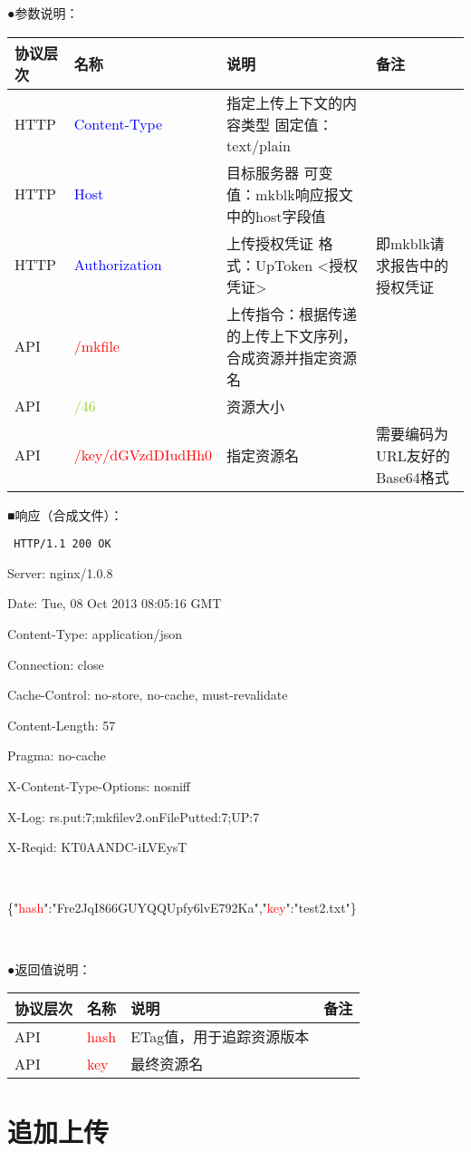 \documentclass[11pt, oneside]{book}
\newcommand{\qblock}[1]{
\vspace{0.1em}
\noindent
#1\par
\vspace{0.1em}
}
\newcommand{\qtable}[1]{\footnotesize\vspace{0.5em}#1\vspace{0.5em}\normalsize}
\newcommand{\qhttp}[1]{\noindent #1\par}
\begin{document}
\qblock{●\thinspace 参数说明：}
\qtable{
\def\arraystretch{2}
\begin{tabular}{|l|p{7em}|p{19em}|p{7em}|}
\hline
协议层次 & 名称 & 说明 & 备注 \\
\hline
HTTP & \textcolor{blue}{Content-Type} & 指定上传上下文的内容类型 \newline 固定值：text/plain & \\
\hline
HTTP & \textcolor{blue}{Host} & 目标服务器 \newline 可变值：mkblk响应报文中的host字段值 & \\
\hline
HTTP & \textcolor{blue}{Authorization} & 上传授权凭证 \newline 格式：UpToken <授权凭证> & 即mkblk请求报告中的授权凭证 \\
\hline
API & \textcolor{red}{/mkfile} & 上传指令：根据传递的上传上下文序列，合成资源并指定资源名 & \\
\hline
API & \textcolor{YellowGreen}{/46} & 资源大小 & \\
\hline
API & \textcolor{red}{/key/dGVzdDIudHh0} & 指定资源名 & 需要编码为URL友好的Base64格式 \\
\hline
\end{tabular}
}

\clearpage 

\qblock{■\thinspace 响应（合成文件）：}
{
\tt \footnotesize
\qhttp{HTTP/1.1 200 OK}
\qhttp{Server: nginx/1.0.8}
\qhttp{Date: Tue, 08 Oct 2013 08:05:16 GMT}
\qhttp{Content-Type: application/json}
\qhttp{Connection: close}
\qhttp{Cache-Control: no-store, no-cache, must-revalidate}
\qhttp{Content-Length: 57}
\qhttp{Pragma: no-cache}
\qhttp{X-Content-Type-Options: nosniff}
\qhttp{X-Log: rs.put:7;mkfilev2.onFilePutted:7;UP:7}
\qhttp{X-Reqid: KT0AANDC-iLVEysT}
\qhttp{\ }
\qhttp{\{"\textcolor{red}{hash}":"Fre2JqI866GUYQQUpfy6lvE792Ka","\textcolor{red}{key}":"test2.txt"\}}
\qhttp{\ }
}

\qblock{●\thinspace 返回值说明：}
\qtable{
\def\arraystretch{2}
\begin{tabular}{|l|p{7em}|p{19em}|p{7em}|}
\hline
协议层次 & 名称 & 说明 & 备注 \\
\hline
API & \textcolor{red}{hash} & ETag值，用于追踪资源版本 & \\
\hline
API & \textcolor{red}{key} & 最终资源名 & \\
\hline
\end{tabular}
}

\section{追加上传}
\end{document}
